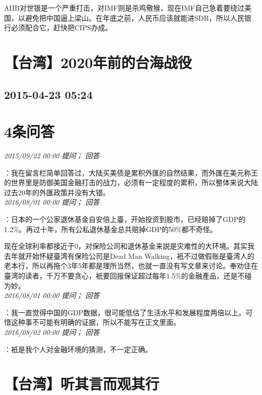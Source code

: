 \documentclass[twocolumn]{ctexart}
\begin{document}
AIIB对世银是一个严重打击，对IMF则是杀鸡儆猴，现在IMF自己急着要绕过美国，以避免把中国逼上梁山。在年底之前，人民币应该就能进SDR，所以人民银行必须配合它，赶快把CIPS办成。\\


\section{【台湾】2020年前的台海战役}
\subsection{2015-04-23 05:24}


\section{4条问答}

\textit{\hfill\noindent\small 2015/09/22 00:00 提问； 回答}

：我在留言栏简单回答过，大陆买美债是累积外匯的自然结果，而外匯在美元称王的世界里是防御美国金融打击的战力，必须有一定程度的累积，所以整体来说大陆过去20年的外匯政策并没有大错。\\

\textit{\hfill\noindent\small 2016/08/01 00:00 提问； 回答}

：日本的一个公家退休基金自安倍上臺，开始投资到股市，已经赔掉了GDP的1.2\%。再过十年，所有公私退休基金总共赔掉GDP的50\%都不奇怪。

现在全球利率都接近于0，对保险公司和退休基金来説是灾难性的大环境。其实我去年就开始怀疑臺湾有保险公司是Dead Man Walking，衹不过做假账是臺湾人的老本行，所以再拖个3年5年都是理所当然，也就一直没有写文章来讨论。奉劝住在臺湾的读者，千万不要贪心，衹要回报保证超过每年1.5\%的金融產品，还是不碰为妙。\\

\textit{\hfill\noindent\small 2016/08/01 00:00 提问； 回答}

：我一直觉得中国的GDP数据，很可能低估了生活水平和发展程度两倍以上。可惜这种事不可能有明确的证据，所以不能写在正文里面。\\

\textit{\hfill\noindent\small 2016/08/02 00:00 提问； 回答}

：衹是我个人对金融环境的猜测，不一定正确。\\


\section{【台湾】听其言而观其行}
\end{document}
